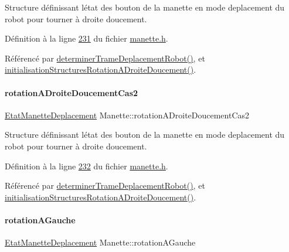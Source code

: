 Structure définissant l\textquotesingle{}état des bouton de la manette en mode deplacement du robot pour tourner à droite doucement. 



Définition à la ligne \hyperlink{manette_8h_source_l00231}{231} du fichier \hyperlink{manette_8h_source}{manette.\+h}.



Référencé par \hyperlink{manette_8cpp_source_l00341}{determiner\+Trame\+Deplacement\+Robot()}, et \hyperlink{manette_8cpp_source_l00188}{initialisation\+Structures\+Rotation\+A\+Droite\+Doucement()}.

\mbox{\label{class_manette_a1ae7c87ab4c27fec817e7b02de9e546b}} 
\paragraph{\texorpdfstring{rotation\+A\+Droite\+Doucement\+Cas2}{rotationADroiteDoucementCas2}}
{\footnotesize\ttfamily \hyperlink{struct_etat_manette_deplacement}{Etat\+Manette\+Deplacement} Manette\+::rotation\+A\+Droite\+Doucement\+Cas2\hspace{0.3cm}{\ttfamily [private]}}



Structure définissant l\textquotesingle{}état des bouton de la manette en mode deplacement du robot pour tourner à droite doucement. 



Définition à la ligne \hyperlink{manette_8h_source_l00232}{232} du fichier \hyperlink{manette_8h_source}{manette.\+h}.



Référencé par \hyperlink{manette_8cpp_source_l00341}{determiner\+Trame\+Deplacement\+Robot()}, et \hyperlink{manette_8cpp_source_l00188}{initialisation\+Structures\+Rotation\+A\+Droite\+Doucement()}.

\mbox{\label{class_manette_a3aa7b857df1a364d70f1626f2f517056}} 
\paragraph{\texorpdfstring{rotation\+A\+Gauche}{rotationAGauche}}
{\footnotesize\ttfamily \hyperlink{struct_etat_manette_deplacement}{Etat\+Manette\+Deplacement} Manette\+::rotation\+A\+Gauche\hspace{0.3cm}{\ttfamily [private]}}



